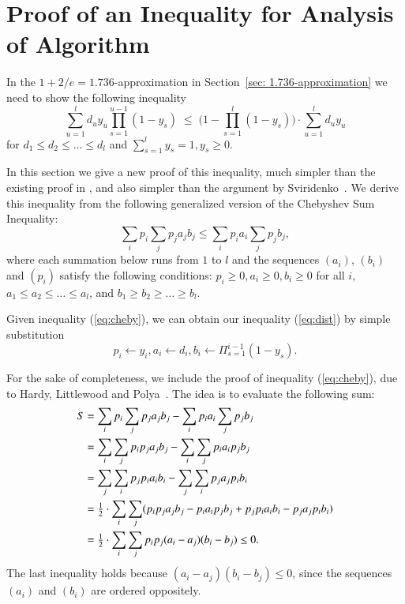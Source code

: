 \documentclass[preprint,12pt]{elsarticle}
\begin{document}

\section{Proof of an Inequality for Analysis of Algorithm~{\ECHS}}

In the $1+2/e=1.736$-approximation in Section~\ref{sec: 1.736-approximation}
we need to show the following inequality
%
\begin{equation}
  \label{eq:dist}
\sum_{u=1}^l d_uy_u\prod_{s=1}^{u-1}(1-y_s)
  \;\leq\;  \Big(1 - \prod_{s=1}^l (1-y_s)\Big) \cdot \sum_{u=1}^l d_u y_u
\end{equation}
%
for $d_1\leq d_2 \leq \ldots \leq d_l$ and $\sum_{s=1}^l y_s = 1, y_s \geq 0$.

In this section we give a new proof of this inequality, much
simpler than the existing proof in \cite{ChudakS04}, and also simpler than
the argument by Sviridenko~\cite{Svi02}.  
We derive this inequality from the following generalized version of the Chebyshev Sum
Inequality:
%
\begin{equation}
  \label{eq:cheby}
  \sum_{i} p_i \sum_j p_j a_j b_j \leq \sum_i p_i a_i \sum_j p_j b_j,
\end{equation}
%
where each summation below runs from $1$ to $l$ and the sequences 
$(a_i)$, $(b_i)$ and $(p_i)$ satisfy the following conditions:
$p_i\geq 0, a_i \geq 0, b_i \geq 0$ for all $i$, $a_1\leq a_2 \leq
\ldots \leq a_l$, and $b_1 \geq b_2 \geq \ldots \geq b_l$.

Given inequality (\ref{eq:cheby}), we can obtain our inequality
(\ref{eq:dist}) by simple substitution
%
\begin{equation*}
  p_i \leftarrow y_i, a_i \leftarrow d_i, b_i \leftarrow
  \Pi_{s=1}^{i-1} (1-y_s).
\end{equation*}

For the sake of completeness, we include the proof of inequality (\ref{eq:cheby}), 
due to Hardy, Littlewood and Polya~\cite{HardyLP88}. The idea is to evaluate the 
following sum:
%
\begin{align*}
  S &= \sum_i p_i \sum_j p_j a_j b_j - \sum_i p_i a_i \sum_j p_j b_j
	\\
  & = \sum_i \sum_j p_i p_j a_j b_j - \sum_i \sum_j p_i a_i p_j b_j
	\\
  & = \sum_j \sum_i p_j p_i a_i b_i - \sum_j \sum _i p_j a_j p_i b_i
	\\
	&= {\mbox{$\frac{1}{2}$}} \cdot \sum_i \sum_j (p_i p_j a_j b_j - p_i a_i p_j b_j + p_j p_i a_i
  							b_i - p_j a_j p_i b_i)
\\
  &= {\mbox{$\frac{1}{2}$}} \cdot \sum_i \sum_j p_i p_j (a_i - a_j)(b_i - b_j) \leq 0.
\end{align*}
The last inequality holds because $(a_i-a_j)(b_i-b_j) \leq 0$, since the sequences
$(a_i)$ and $(b_i)$ are ordered oppositely.
\end{document}
